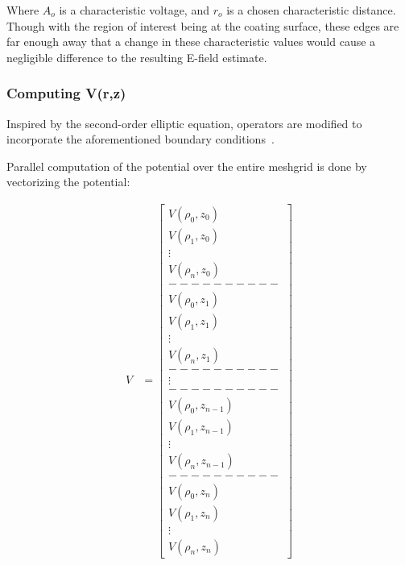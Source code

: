 Where $A_o$ is a characteristic voltage, and $r_o$ is a chosen characteristic distance. Though with the region of interest being at the coating surface, these edges are far enough away that a change in these characteristic values would cause a negligible difference to the resulting E-field estimate.

\newpage

\subsubsection*{Computing V(r,z)}

Inspired by the second-order elliptic equation, operators are modified to incorporate the aforementioned boundary conditions~\cite{Press:2007}.


Parallel computation of the potential over the entire meshgrid is done by vectorizing the potential:

\[ 
 \begin{aligned}
    V &= \begin{bmatrix}
           V(\rho_0, z_0) \\
           V(\rho_1, z_0) \\
           \vdots \\
	   V(\rho_n, z_0) \\
	   ---------- \\
	   V(\rho_0, z_1) \\
           V(\rho_1, z_1) \\
           \vdots \\
	   V(\rho_n, z_1) \\
	   ---------- \\
	   \vdots \\
	   ---------- \\
	   V(\rho_0, z_{n-1}) \\
           V(\rho_1, z_{n-1}) \\
           \vdots \\
           V(\rho_n, z_{n-1}) \\
           ---------- \\
           V(\rho_0, z_n) \\
	   V(\rho_1, z_n) \\
	   \vdots \\
	   V(\rho_n, z_n) 
         \end{bmatrix}
  \end{aligned}
\]

\newpage
\iffalse

